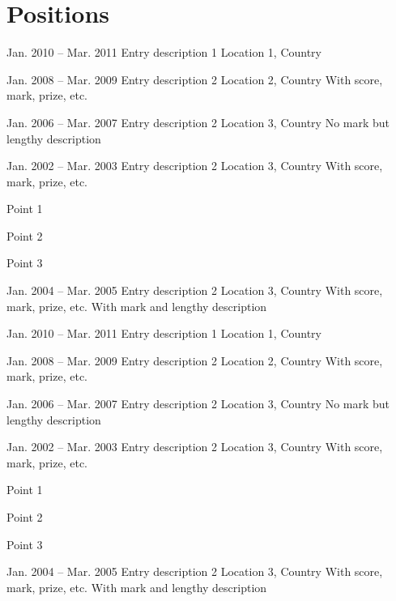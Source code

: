 
\section{Positions}%
    
\begin{cventries}[right]

    \cventry
    {Jan. 2010 -- Mar. 2011}%
    {Entry description 1}%
    {Location 1, Country}%
    {}%
    {}%

    \cventry
    {Jan. 2008 -- Mar. 2009}%
    {Entry description 2}%
    {Location 2, Country}%
    {With score, mark, prize, etc.}%
    {}%

    \cventry
    {Jan. 2006 -- Mar. 2007}%
    {Entry description 2}%
    {Location 3, Country}%
    {}%
    {No mark but lengthy description}%

    \cventry
    {Jan. 2002 -- Mar. 2003}%
    {Entry description 2}%
    {Location 3, Country}%
    {With score, mark, prize, etc.}%
    {%
        \begin{cvitems}%
            \item Point 1
            \item Point 2
            \item Point 3
        \end{cvitems}%
    }%
    
    \cventry
    {Jan. 2004 -- Mar. 2005}%
    {Entry description 2}%
    {Location 3, Country}%
    {With score, mark, prize, etc.}%
    {With mark and lengthy description}

\end{cventries}

\begin{cventries}

    \cventry
    {Jan. 2010 -- Mar. 2011}%
    {Entry description 1}%
    {Location 1, Country}%
    {}%
    {}%

    \cventry
    {Jan. 2008 -- Mar. 2009}%
    {Entry description 2}%
    {Location 2, Country}%
    {With score, mark, prize, etc.}%
    {}%

    \cventry
    {Jan. 2006 -- Mar. 2007}%
    {Entry description 2}%
    {Location 3, Country}%
    {}%
    {No mark but lengthy description}%

    \cventry
    {Jan. 2002 -- Mar. 2003}%
    {Entry description 2}%
    {Location 3, Country}%
    {With score, mark, prize, etc.}%
    {%
        \begin{cvitems}%
            \item Point 1
            \item Point 2
            \item Point 3
        \end{cvitems}%
    }%
    
    \cventry
    {Jan. 2004 -- Mar. 2005}%
    {Entry description 2}%
    {Location 3, Country}%
    {With score, mark, prize, etc.}%
    {With mark and lengthy description}

\end{cventries}

\clearsection
